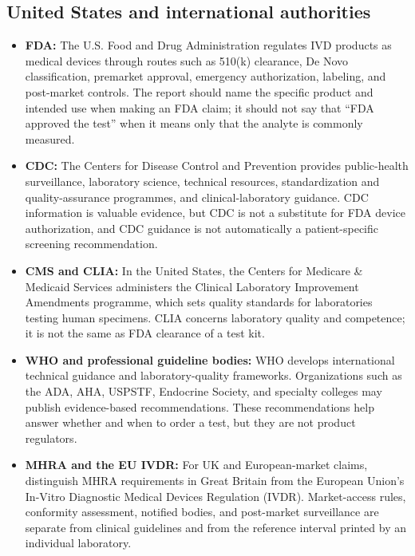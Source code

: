 \documentclass[11pt,openany]{book}
\begin{document}
\subsection*{United States and international authorities}

\begin{itemize}[leftmargin=*]
  \item \textbf{FDA:} The U.S. Food and Drug Administration regulates IVD
  products as medical devices through routes such as 510(k) clearance, De Novo
  classification, premarket approval, emergency authorization, labeling, and
  post-market controls. The report should name the specific product and
  intended use when making an FDA claim; it should not say that ``FDA approved
  the test'' when it means only that the analyte is commonly measured.
  \item \textbf{CDC:} The Centers for Disease Control and Prevention provides
  public-health surveillance, laboratory science, technical resources,
  standardization and quality-assurance programmes, and clinical-laboratory
  guidance. CDC information is valuable evidence, but CDC is not a substitute
  for FDA device authorization, and CDC guidance is not automatically a
  patient-specific screening recommendation.
  \item \textbf{CMS and CLIA:} In the United States, the Centers for Medicare
  \& Medicaid Services administers the Clinical Laboratory Improvement
  Amendments programme, which sets quality standards for laboratories testing
  human specimens. CLIA concerns laboratory quality and competence; it is not
  the same as FDA clearance of a test kit.
  \item \textbf{WHO and professional guideline bodies:} WHO develops
  international technical guidance and laboratory-quality frameworks.
  Organizations such as the ADA, AHA, USPSTF, Endocrine Society, and specialty
  colleges may publish evidence-based recommendations. These recommendations
  help answer whether and when to order a test, but they are not product
  regulators.
  \item \textbf{MHRA and the EU IVDR:} For UK and European-market claims,
  distinguish MHRA requirements in Great Britain from the European Union's
  In-Vitro Diagnostic Medical Devices Regulation (IVDR). Market-access rules,
  conformity assessment, notified bodies, and post-market surveillance are
  separate from clinical guidelines and from the reference interval printed by
  an individual laboratory.
\end{itemize}
\end{document}
